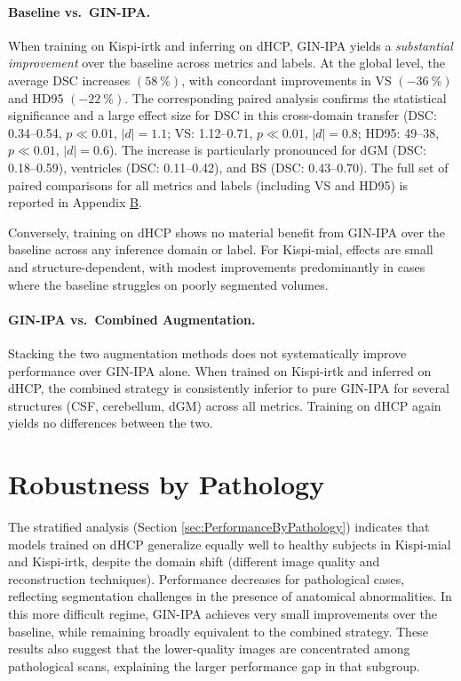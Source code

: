 \paragraph{Baseline vs.\ GIN-IPA.}
When training on Kispi-irtk and inferring on dHCP, GIN-IPA yields a \emph{substantial improvement} over the baseline across metrics and labels. At the global level, the average DSC increases $(\qty{+58}{\percent})$, with concordant improvements in VS $(\qty{-36}{\percent})$ and HD95 $(\qty{-22}{\percent})$. The corresponding paired analysis confirms the statistical significance and a large effect size for DSC in this cross-domain transfer (DSC: \numrange[range-open-phrase=from\ ]{0.34}{0.54}, $p \ll 0.01$, $|d|=1.1$; VS: \numrange[range-open-phrase=from\ ]{1.12}{0.71}, $p\ll 0.01$, $|d|=0.8$; HD95: \numrange[range-open-phrase=from\ ]{49}{38}, $p\ll 0.01$, $|d|=0.6$). The increase is particularly pronounced for dGM (DSC: \numrange[range-open-phrase=from\ ]{0.18}{0.59}), ventricles (DSC: \numrange[range-open-phrase=from\ ]{0.11}{0.42}), and BS (DSC: \numrange[range-open-phrase=from\ ]{0.43}{0.70}). The full set of paired comparisons for all metrics and labels (including VS and HD95) is reported in Appendix \hyperref[app:SupplementaryTables]{B}.

Conversely, training on dHCP shows no material benefit from GIN-IPA over the baseline across any inference domain or label. For Kispi-mial, effects are small and structure-dependent, with modest improvements predominantly in cases where the baseline struggles on poorly segmented volumes.

\paragraph{GIN-IPA vs.\ Combined Augmentation.}
Stacking the two augmentation methods does not systematically improve performance over GIN-IPA alone. When trained on Kispi-irtk and inferred on dHCP, the combined strategy is consistently inferior to pure GIN-IPA for several structures (CSF, cerebellum, dGM) across all metrics. Training on dHCP again yields no differences between the two.

\section{Robustness by Pathology}
The stratified analysis (Section \ref{sec:PerformanceByPathology}) indicates that models trained on dHCP generalize equally well to healthy subjects in Kispi-mial and Kispi-irtk, despite the domain shift (different image quality and reconstruction techniques). Performance decreases for pathological cases, reflecting segmentation challenges in the presence of anatomical abnormalities. In this more difficult regime, GIN-IPA achieves very small improvements over the baseline, while remaining broadly equivalent to the combined strategy. These results also suggest that the lower-quality images are concentrated among pathological scans, explaining the larger performance gap in that subgroup.

